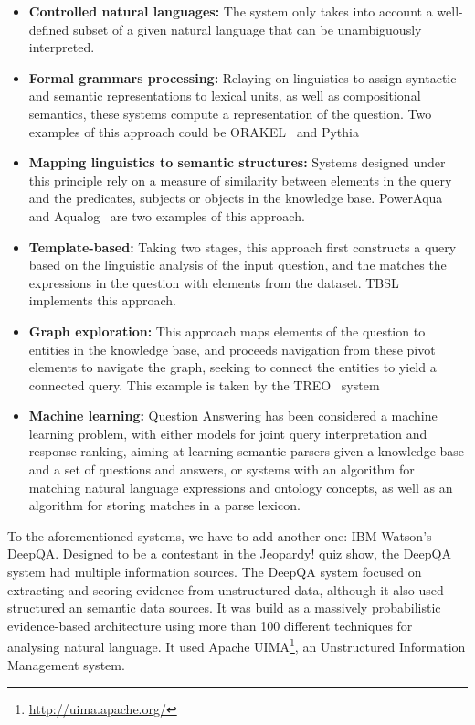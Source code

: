 \begin{itemize}
  \item \textbf{Controlled natural languages:} The system only takes into account a well-defined subset of a given natural language that can be unambiguously interpreted.
  \item \textbf{Formal grammars processing:} Relaying on linguistics to assign syntactic and semantic representations to lexical units, as well as compositional semantics, these systems compute a representation of the question. Two examples of this approach could be ORAKEL~\cite{cimiano2008towards} and Pythia~\cite{unger2011pythia}
  \item \textbf{Mapping linguistics to semantic structures:} Systems designed under this principle rely on a measure of similarity between elements in the query and the predicates, subjects or objects in the knowledge base. PowerAqua~\cite{lopez2011poweraqua} and Aqualog~\cite{lopez2007aqualog} are two examples of this approach.
  \item \textbf{Template-based:} Taking two stages, this approach first constructs a query based on the linguistic analysis of the input question, and the matches the expressions in the question with elements from the dataset. TBSL~\cite{unger2012template} implements this approach.
  \item \textbf{Graph exploration:} This approach maps elements of the question to entities in the knowledge base, and proceeds navigation from these pivot elements to navigate the graph, seeking to connect the entities to yield a connected query. This example is taken by the TREO~\cite{freitas2011querying} system
  \item \textbf{Machine learning:} Question Answering has been considered a machine learning problem, with either models for joint query interpretation and response ranking, aiming at learning semantic parsers given a knowledge base and a set of questions and answers, or systems with an algorithm for matching natural language expressions and ontology concepts, as well as an algorithm for storing matches in a parse lexicon.
\end{itemize}


To the aforementioned systems, we have to add another one: IBM Watson's DeepQA. Designed to be a contestant in the Jeopardy! quiz show, the DeepQA system had multiple information sources. The DeepQA system focused on extracting and scoring evidence from unstructured data, although it also used structured an semantic data sources. It was build as a massively probabilistic evidence-based architecture using more than 100 different techniques for analysing natural language. It used Apache UIMA\footnote{\url{http://uima.apache.org/}}, an Unstructured Information Management system.

